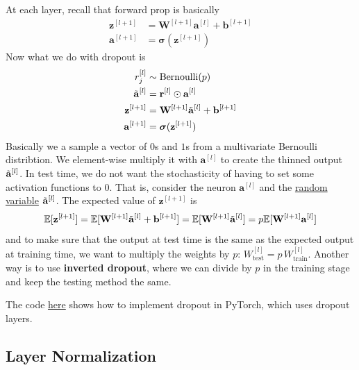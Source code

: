   At each layer, recall that forward prop is basically 
  \begin{align*}
      \mathbf{z}^{[l+1]} & = \mathbf{W}^{[l+1]} \mathbf{a}^{[l]} + \mathbf{b}^{[l+1]} \\
      \mathbf{a}^{[l+1]} & = \boldsymbol{\sigma} (\mathbf{z}^{[l+1]}) 
  \end{align*}
  Now what we do with dropout is 
  \begin{align*}
      r_j^{[l]} & \sim \mathrm{Bernoulli}(p) \\
      \Tilde{\mathbf{a}}^{[l]} & = \mathbf{r}^{[l]} \odot \mathbf{a}^{[l]} \\
      \mathbf{z}^{[l+1]} & = \mathbf{W}^{[l+1]} \Tilde{\mathbf{a}}^{[l]} + \mathbf{b}^{[l+1]} \\
      \mathbf{a}^{[l+1]} & = \boldsymbol{\sigma} (\mathbf{z}^{[l+1]}) 
  \end{align*}
  Basically we a sample a vector of $0$s and $1$s from a multivariate Bernoulli distribtion. We element-wise multiply it with $\mathbf{a}^{[l]}$ to create the thinned output $\Tilde{\mathbf{a}}^{[l]}$. In test time, we do not want the stochasticity of having to set some activation functions to $0$. That is, consider the neuron $\mathbf{a}^{[l]}$ and the \hyperref[prob-def:random-variable]{random variable} $\Tilde{\mathbf{a}}^{[l]}$. The expected value of $\mathbf{z}^{[l+1]}$ is 
  \begin{equation}
    \mathbb{E}[\mathbf{z}^{[l+1]}] = \mathbb{E}[ \mathbf{W}^{[l+1]} \Tilde{\mathbf{a}}^{[l]} + \mathbf{b}^{[l+1]}] = \mathbb{E}[ \mathbf{W}^{[l+1]} \Tilde{\mathbf{a}}^{[l]}] = p \mathbb{E}[\mathbf{W}^{[l+1]} \mathbf{a}^{[l]}]
  \end{equation}
  and to make sure that the output at test time is the same as the expected output at training time, we want to multiply the weights by $p$: $W^{[l]}_{\text{test}} = p \, W^{[l]}_{\text{train}}$. Another way is to use \textbf{inverted dropout}, where we can divide by $p$ in the training stage and keep the testing method the same. 

  \begin{code} 
    The code \href{code/dropout.ipynb}{here} shows how to implement dropout in PyTorch, which uses dropout layers. 
  \end{code}

\subsection{Layer Normalization} 

